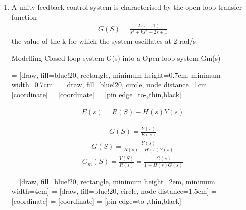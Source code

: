 \begin{enumerate}[label=\thesection.\arabic*.,ref=\thesection.\theenumi]
\item A unity feedback control system is characterised by the open-loop transfer function
\begin{align}
G(S) = \frac{2(s+1)}{s^3 + ks^2 + 2s +1}
\end{align}
the value of the k for which the system oscillates at 2 rad/s

\solution
Modelling Closed loop system G(s) into a Open loop system Gm(s)

 = [draw, fill=blue!20, rectangle, 
    minimum height=0.7cm, minimum width=0.7cm]
 = [draw, fill=blue!20, circle, node distance=1cm]
 = [coordinate]
 = [coordinate]
 = [pin edge={to-,thin,black}]



\begin{align}
E(s) = R(S) - H(s)Y(s)
\end{align}

\begin{align}
 G(S) = \frac{Y(s)}{E(s)}
\end{align}
\begin{align}
 G(S) = \frac{Y(s)}{R(s) - H(s)Y(s)}
\end{align}
\begin{align}
 G_{m}(S) = \frac{Y(S)}{R(s)} = \frac{G(s)}{1 + H(s)G(s)}\label{sys_res}
\end{align}


 = [draw, fill=blue!20, rectangle, 
    minimum height=2em, minimum width=4em]
 = [draw, fill=blue!20, circle, node distance=1.5cm]
 = [coordinate]
 = [coordinate]
 = [pin edge={to-,thin,black}]


\end{enumerate}
